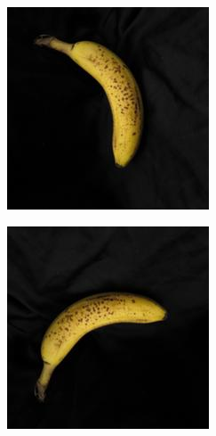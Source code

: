 \documentclass[final]{beamer}
\newlength{\onecolwid}
\begin{document}
\begin{frame}[t]
\begin{columns}[t]
\begin{column}{\onecolwid}
\begin{figure}
\begin{subfigure}{.123\textwidth}
\end{subfigure}%
 \begin{subfigure}{.123\textwidth}
  \centering
\includegraphics[width=\textwidth]{2_2.jpg}
\end{subfigure}%
  \begin{subfigure}{.123\textwidth}
  \centering
\includegraphics[width=\textwidth]{2_3.jpg}

\end{subfigure}
\end{figure}
\end{column}
\end{columns}
\end{frame}
\end{document}
